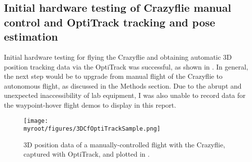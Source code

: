 \subsection{Initial hardware testing of Crazyflie manual control and OptiTrack tracking and pose estimation}
Initial hardware testing for flying the Crazyflie and obtaining automatic 3D position tracking data via the OptiTrack was successful, as shown in . In general, the next step would be to upgrade from manual flight of the Crazyflie to autonomous flight, as discussed in the Methods section. Due to the abrupt and unexpected inaccessibility of lab equipment, I was also unable to record data for the waypoint-hover flight demos to display in this report.
\begin{figure}
\begin{center}
\texttt{[image: \\myroot/figures/3DCfOptiTrackSample.png]}
\end{center}
\caption{3D  position data  of a manually-controlled flight with the Crazyflie, captured with OptiTrack, and plotted in \MATLAB.}
\label{fig:manualFlight}
\end{figure}
	


